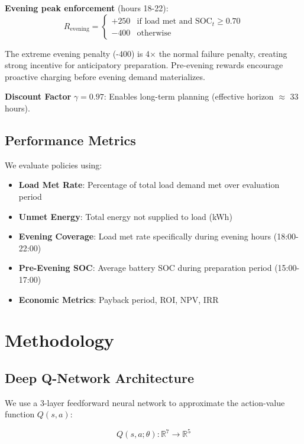 \documentclass[11pt,a4paper]{article}
\begin{document}
\textbf{Evening peak enforcement} (hours 18-22):
\begin{equation}
R_{\text{evening}} = \begin{cases}
+250 & \text{if load met and } \text{SOC}_t \geq 0.70 \\
-400 & \text{otherwise}
\end{cases}
\end{equation}

The extreme evening penalty (-400) is 4$\times$ the normal failure penalty, creating strong incentive for anticipatory preparation. Pre-evening rewards encourage proactive charging before evening demand materializes.

\textbf{Discount Factor} $\gamma = 0.97$: Enables long-term planning (effective horizon $\approx$ 33 hours).

\subsection{Performance Metrics}

We evaluate policies using:
\begin{itemize}
    \item \textbf{Load Met Rate}: Percentage of total load demand met over evaluation period
    \item \textbf{Unmet Energy}: Total energy not supplied to load (kWh)
    \item \textbf{Evening Coverage}: Load met rate specifically during evening hours (18:00-22:00)
    \item \textbf{Pre-Evening SOC}: Average battery SOC during preparation period (15:00-17:00)
    \item \textbf{Economic Metrics}: Payback period, ROI, NPV, IRR
\end{itemize}

\section{Methodology}
\label{sec:method}

\subsection{Deep Q-Network Architecture}

We use a 3-layer feedforward neural network to approximate the action-value function $Q(s, a)$:

\begin{equation}
Q(s, a; \theta) : \mathbb{R}^7 \rightarrow \mathbb{R}^5
\end{equation}
\end{document}

